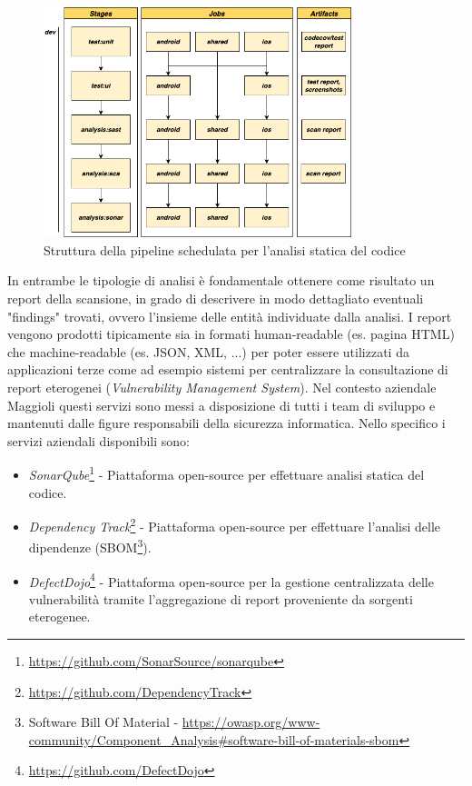 \begin{figure}[H]
\centering
\includegraphics[width=0.8\textwidth]{img/tesi-16-cicd-scheduled.drawio.png}
\caption{Struttura della pipeline schedulata per l'analisi statica del codice}
\end{figure}

In entrambe le tipologie di analisi è fondamentale ottenere come risultato un report della scansione, in grado di descrivere in modo dettagliato eventuali "findings" trovati, ovvero l'insieme delle entità individuate dalla analisi. I report vengono prodotti tipicamente sia in formati human-readable (es. pagina HTML) che machine-readable (es. JSON, XML, ...) per poter essere utilizzati da applicazioni terze come ad esempio sistemi per centralizzare la consultazione di report eterogenei (\textit{Vulnerability Management System}). Nel contesto aziendale Maggioli questi servizi sono messi a disposizione di tutti i team di sviluppo e mantenuti dalle figure responsabili della sicurezza informatica. Nello specifico i servizi aziendali disponibili sono:
\begin{itemize}
    \item \textit{SonarQube}\footnote{\url{https://github.com/SonarSource/sonarqube}} - Piattaforma open-source per effettuare analisi statica del codice.
    \item \textit{Dependency Track}\footnote{\url{https://github.com/DependencyTrack}} - Piattaforma open-source per effettuare l'analisi delle dipendenze (SBOM\footnote{Software Bill Of Material - \url{https://owasp.org/www-community/Component_Analysis\#software-bill-of-materials-sbom}}).
    \item \textit{DefectDojo}\footnote{\url{https://github.com/DefectDojo}} - Piattaforma open-source per la gestione centralizzata delle vulnerabilità tramite l'aggregazione di report proveniente da sorgenti eterogenee.
\end{itemize}

